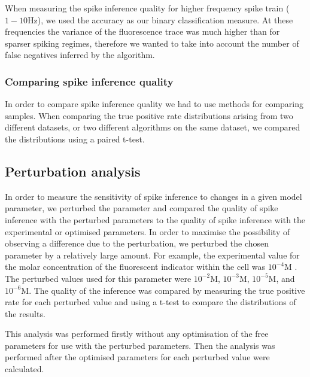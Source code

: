 When measuring the spike inference quality for higher frequency spike train ($1-10$Hz), we used the accuracy as our binary classification measure. At these frequencies the variance of the fluorescence trace was much higher than for sparser spiking regimes, therefore we wanted to take into account the number of false negatives inferred by the algorithm.

\subsubsection{Comparing spike inference quality}
In order to compare spike inference quality we had to use methods for comparing samples. When comparing the true positive rate distributions arising from two different datasets, or two different algorithms on the same dataset, we compared the distributions using a paired t-test. %

\subsection{Perturbation analysis}
In order to measure the sensitivity of spike inference to changes in a given model parameter, we perturbed the parameter and compared the quality of spike inference with the perturbed parameters to the quality of spike inference with the experimental or optimised parameters. In order to maximise the possibility of observing a difference due to the perturbation, we perturbed the chosen parameter by a relatively large amount. For example, the experimental value for the molar concentration of the fluorescent indicator within the cell was $10^{-4}$M  \parencite{maravall}. The perturbed values used for this parameter were $10^{-2}$M, $10^{-3}$M, $10^{-5}$M, and $10^{-6}$M. The quality of the inference was compared by measuring the true positive rate for each perturbed value and using a t-test to compare the distributions of the results.

This analysis was performed firstly without any optimisation of the free parameters for use with the perturbed parameters. Then the analysis was performed after the optimised parameters for each perturbed value were calculated.

